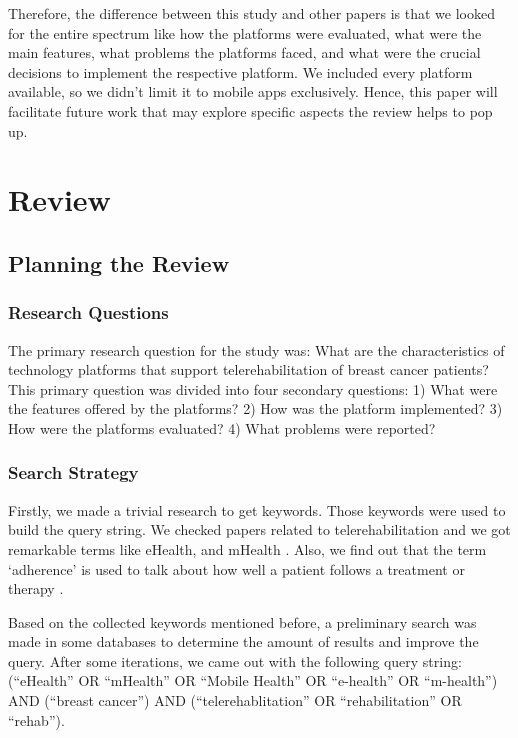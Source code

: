 \documentclass[conference]{IEEEtran}
\begin{document}
Therefore, the difference between this study and other papers is that we looked for the entire spectrum like how the platforms were evaluated, what were the main features, what problems the platforms faced, and what were the crucial decisions to implement the respective platform. We included every platform available, so we didn't limit it to mobile apps exclusively. Hence, this paper will facilitate future work that may explore specific aspects the review helps to pop up.

\section{Review}

\subsection{Planning the Review}

\subsubsection{Research Questions} \label{subsubsection:research_question}
The primary research question for the study was: What are the characteristics of technology platforms that support telerehabilitation of breast cancer patients? This primary question was divided into four secondary questions: 1) What were the features offered by the platforms? 2) How was the platform implemented? 3) How were the platforms evaluated? 4) What problems were reported?

\subsubsection{Search Strategy}
Firstly, we made a trivial research to get keywords. Those keywords were used to build the query string. We checked papers related to telerehabilitation and we got remarkable terms like eHealth, and mHealth \cite{iacono_scoping_2016}. Also, we find out that the term `adherence' is used to talk about how well a patient follows a treatment or therapy \cite{JEMINIWA201959}.

Based on the collected keywords mentioned before, a preliminary search was made in some databases to determine the amount of results and improve the query. After some iterations, we came out with the following query string: (``eHealth'' OR ``mHealth'' OR ``Mobile Health'' OR ``e-health'' OR ``m-health'') AND (``breast cancer'') AND (``telerehablitation'' OR ``rehabilitation'' OR ``rehab'').
\end{document}
